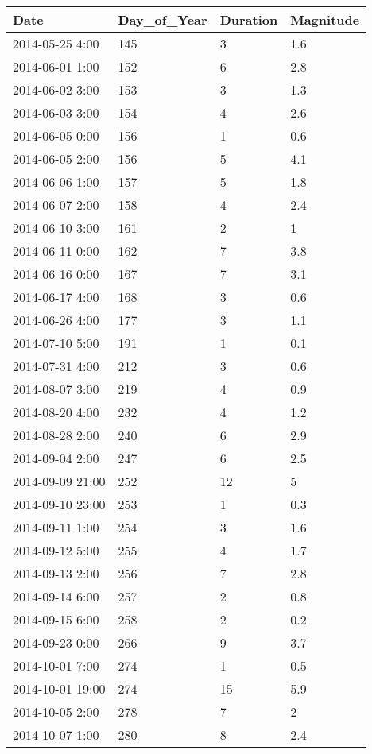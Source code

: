 \documentclass[
]{article}
\begin{document}
\begin{tabular}{l|l|l|l}
\hline
Date & Day\_of\_Year & Duration & Magnitude\\
\hline
2014-05-25 4:00 & 145 & 3 & 1.6\\
\hline
2014-06-01 1:00 & 152 & 6 & 2.8\\
\hline
2014-06-02 3:00 & 153 & 3 & 1.3\\
\hline
2014-06-03 3:00 & 154 & 4 & 2.6\\
\hline
2014-06-05 0:00 & 156 & 1 & 0.6\\
\hline
2014-06-05 2:00 & 156 & 5 & 4.1\\
\hline
2014-06-06 1:00 & 157 & 5 & 1.8\\
\hline
2014-06-07 2:00 & 158 & 4 & 2.4\\
\hline
2014-06-10 3:00 & 161 & 2 & 1\\
\hline
2014-06-11 0:00 & 162 & 7 & 3.8\\
\hline
2014-06-16 0:00 & 167 & 7 & 3.1\\
\hline
2014-06-17 4:00 & 168 & 3 & 0.6\\
\hline
2014-06-26 4:00 & 177 & 3 & 1.1\\
\hline
2014-07-10 5:00 & 191 & 1 & 0.1\\
\hline
2014-07-31 4:00 & 212 & 3 & 0.6\\
\hline
2014-08-07 3:00 & 219 & 4 & 0.9\\
\hline
2014-08-20 4:00 & 232 & 4 & 1.2\\
\hline
2014-08-28 2:00 & 240 & 6 & 2.9\\
\hline
2014-09-04 2:00 & 247 & 6 & 2.5\\
\hline
2014-09-09 21:00 & 252 & 12 & 5\\
\hline
2014-09-10 23:00 & 253 & 1 & 0.3\\
\hline
2014-09-11 1:00 & 254 & 3 & 1.6\\
\hline
2014-09-12 5:00 & 255 & 4 & 1.7\\
\hline
2014-09-13 2:00 & 256 & 7 & 2.8\\
\hline
2014-09-14 6:00 & 257 & 2 & 0.8\\
\hline
2014-09-15 6:00 & 258 & 2 & 0.2\\
\hline
2014-09-23 0:00 & 266 & 9 & 3.7\\
\hline
2014-10-01 7:00 & 274 & 1 & 0.5\\
\hline
2014-10-01 19:00 & 274 & 15 & 5.9\\
\hline
2014-10-05 2:00 & 278 & 7 & 2\\
\hline
2014-10-07 1:00 & 280 & 8 & 2.4\\
\hline
\end{tabular}
\end{document}

